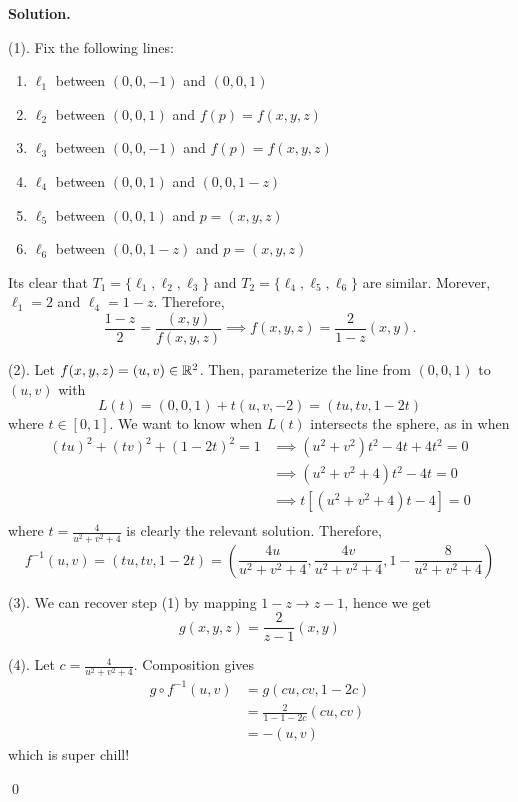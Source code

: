 \documentclass[12pt]{book}
\theoremstyle{definition}
\newenvironment{solution}
{%
  \par\noindent\textbf{Solution.}\quad
}
{%
  \qed\par
}
\begin{document}
\begin{solution}
  (1). Fix the following lines:
  \begin{enumerate}
    \item $\ell_1$ between $(0,0,-1)$ and $(0,0,1)$
    \item $\ell_2$ between $(0,0,1)$ and $f(p) = f(x,y,z)$
    \item $\ell_3$ between $(0,0,-1)$ and $f(p) = f(x,y,z)$
    \item $\ell_4$ between $(0,0,1)$ and $(0,0,1-z)$
    \item $\ell_5$ between $(0,0,1)$ and $p = (x,y,z)$
    \item $\ell_6$ between $(0,0,1-z)$ and $p = (x,y,z)$
  \end{enumerate}
  Its clear that $T_1 = \{\ell_1, \ell_2, \ell_3\}$ and $T_2 = \{\ell_4, \ell_5, \ell_6\}$ are similar.
  Morever, $\ell_1 = 2$ and $\ell_4 = 1-z$.
  Therefore,
  \[
  \frac{1-z}{2} = \frac{(x,y)}{f(x,y,z)} \implies f(x,y,z) = \frac{2}{1-z}(x,y).
  \]
 
  (2). Let $f(x,y,z) = (u, v) \in \mathbb{R}^2$.
  Then, parameterize the line from $(0,0,1)$ to $(u,v)$ with
  \[L(t) = (0, 0, 1) + t(u, v, -2) = (tu, tv, 1-2t)\]
  where $t \in [0, 1]$.
  We want to know when $L(t)$ intersects the sphere, as in when 
  \[\begin{aligned}
    (tu)^2 + (tv)^2 + (1-2t)^2 = 1 &\implies (u^2 + v^2)t^2 -4t + 4t^2= 0 \\
                                   &\implies (u^2 + v^2 + 4)t^2 -4t= 0 \\
                                   &\implies t\left[(u^2 + v^2 + 4)t -4 \right]= 0 \\
  \end{aligned}
  \]
  where $t = \frac{4}{u^2 + v^2 + 4}$ is clearly the relevant solution.
  Therefore, 
  \[
  f^{-1}(u, v) = (tu, tv, 1-2t) = \left(\frac{4u}{u^2 + v^2 + 4},\frac{4v}{u^2 + v^2 + 4},1 - \frac{8}{u^2 + v^2 + 4} \right)
  \]
  
  (3). We can recover step (1) by mapping $1-z \to z-1$, hence we get 
  \[g(x,y,z) = \frac{2}{z-1}(x,y)\] 

  (4). Let $c = \frac{4}{u^2 + v^2 + 4}$.
  Composition gives
  \[\begin{aligned}
    g \circ f^{-1}(u, v) &= g\left(cu,cv,1 - 2c\right) \\
                         &= \frac{2}{1-1-2c}(cu, cv) \\
                         &= -(u,v)
  \end{aligned}\]
  which is super chill!

\end{solution}
\end{document}
